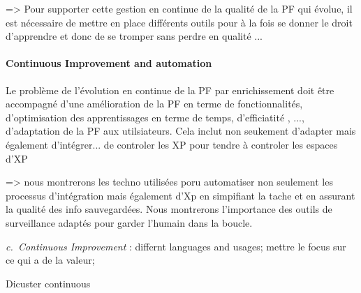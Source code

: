 \documentclass{llncs}
\newcounter{NoReq}
\newcommand{\req}[3]{\refstepcounter{NoReq} \textit{c.\theNoReq~{#2}}\label{#1} : {#3}}
\begin{document}
=> Pour supporter cette gestion en continue de la qualité de la PF qui évolue, il est nécessaire de mettre en place différents outils pour à la fois se donner le droit d'apprendre et donc de se tromper sans perdre en qualité ...


\paragraph{Continuous Improvement and automation}
Le problème de l'évolution en continue de la PF par enrichissement doit être accompagné d'une amélioration de la PF en terme de fonctionnalités, d'optimisation des apprentissages en terme de temps, d'efficiatité , ..., d'adaptation de la PF aux utilsiateurs.
Cela inclut non seukement d'adapter mais également d'intégrer... 
de controler les XP pour tendre à controler les espaces d'XP

=> nous montrerons les techno utilisées poru automatiser non seulement les processus d'intégration mais également d'Xp en simpifiant la tache et en assurant la qualité des info sauvegardées.
Nous montrerons l'importance des outils de surveillance adaptés pour garder l'humain dans la boucle.

\req{Continuous}{Continuous Improvement}{ differnt languages and usages; mettre le focus sur ce qui a de la valeur; 
}

Dicuster continuous
\end{document}
